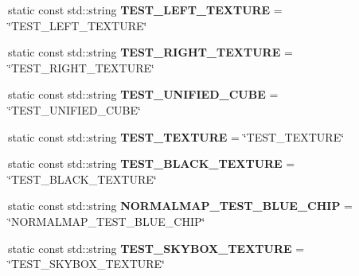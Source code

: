 \begin{DoxyCompactItemize}
\item 
\mbox{\label{struct_geometry_engine_1_1_geometry_material_1_1_texture_constant_a14d17c2dd6125effc0109ac404df9741}} 
static const std\+::string {\bfseries T\+E\+S\+T\+\_\+\+L\+E\+F\+T\+\_\+\+T\+E\+X\+T\+U\+RE} = \char`\"{}T\+E\+S\+T\+\_\+\+L\+E\+F\+T\+\_\+\+T\+E\+X\+T\+U\+RE\char`\"{}
\item 
\mbox{\label{struct_geometry_engine_1_1_geometry_material_1_1_texture_constant_ac18fed20edf867ce13ccd3cb3cde43cd}} 
static const std\+::string {\bfseries T\+E\+S\+T\+\_\+\+R\+I\+G\+H\+T\+\_\+\+T\+E\+X\+T\+U\+RE} = \char`\"{}T\+E\+S\+T\+\_\+\+R\+I\+G\+H\+T\+\_\+\+T\+E\+X\+T\+U\+RE\char`\"{}
\item 
\mbox{\label{struct_geometry_engine_1_1_geometry_material_1_1_texture_constant_a133496f744e5c15fb2b2bed24b348f2d}} 
static const std\+::string {\bfseries T\+E\+S\+T\+\_\+\+U\+N\+I\+F\+I\+E\+D\+\_\+\+C\+U\+BE} = \char`\"{}T\+E\+S\+T\+\_\+\+U\+N\+I\+F\+I\+E\+D\+\_\+\+C\+U\+BE\char`\"{}
\item 
\mbox{\label{struct_geometry_engine_1_1_geometry_material_1_1_texture_constant_ac96667257b17fce30cf2a27785483bd7}} 
static const std\+::string {\bfseries T\+E\+S\+T\+\_\+\+T\+E\+X\+T\+U\+RE} = \char`\"{}T\+E\+S\+T\+\_\+\+T\+E\+X\+T\+U\+RE\char`\"{}
\item 
\mbox{\label{struct_geometry_engine_1_1_geometry_material_1_1_texture_constant_ac0676c7dcdd7639f65e6bd1cb2b67772}} 
static const std\+::string {\bfseries T\+E\+S\+T\+\_\+\+B\+L\+A\+C\+K\+\_\+\+T\+E\+X\+T\+U\+RE} = \char`\"{}T\+E\+S\+T\+\_\+\+B\+L\+A\+C\+K\+\_\+\+T\+E\+X\+T\+U\+RE\char`\"{}
\item 
\mbox{\label{struct_geometry_engine_1_1_geometry_material_1_1_texture_constant_a31aa79e8443d0d82bc58e302069248a6}} 
static const std\+::string {\bfseries N\+O\+R\+M\+A\+L\+M\+A\+P\+\_\+\+T\+E\+S\+T\+\_\+\+B\+L\+U\+E\+\_\+\+C\+H\+IP} = \char`\"{}N\+O\+R\+M\+A\+L\+M\+A\+P\+\_\+\+T\+E\+S\+T\+\_\+\+B\+L\+U\+E\+\_\+\+C\+H\+IP\char`\"{}
\item 
\mbox{\label{struct_geometry_engine_1_1_geometry_material_1_1_texture_constant_a9da12e082b0b180fe7c96ec39bedc2ae}} 
static const std\+::string {\bfseries T\+E\+S\+T\+\_\+\+S\+K\+Y\+B\+O\+X\+\_\+\+T\+E\+X\+T\+U\+RE} = \char`\"{}T\+E\+S\+T\+\_\+\+S\+K\+Y\+B\+O\+X\+\_\+\+T\+E\+X\+T\+U\+RE\char`\"{}
\end{DoxyCompactItemize}


